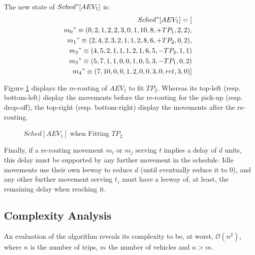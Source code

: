 The new state of $Sched"[AEV_1]$ is: 
\begin{align*}
Sched"[AEV_1] = [\\
m_0" \equiv ( 0, 2, 1, 2, 2, 3, 0, 1, 10, 8, +TP_1, 2, 2 ),\\
m_1" \equiv ( 2, 4, 2, 3, 2, 1, 1, 2, 8, 6, +TP_2, 0, 2 ),\\
m_2" \equiv ( 4, 5, 2, 1, 1, 1, 2, 1, 6, 5, -TP_2, 1, 1 )\\ 
m_3" \equiv ( 5, 7, 1, 1, 0, 0, 1, 0, 5, 3, -TP_1, 0, 2 )\\ 
m_4" \equiv ( 7, 10, 0, 0, 1, 2, 0, 0, 3, 0, ret, 3, 0 )]										 
\end{align*}	

Figure \ref{fig:sched_AEV_1_TP_2} displays the re-routing of $AEV_1$ to fit $TP_2$. 
Whereas its top-left (resp. bottom-left) display the movements before the re-routing for the pick-up (resp. drop-off), the top-right (resp. bottom-right) display the movements after the re-routing.
\begin{figure}[t]
  \vspace{-0.2cm}
  \centering
   {}
  \caption{$Sched[AEV_1]$ when Fitting $TP_2$}
  \label{fig:sched_AEV_1_TP_2}
  \vspace{-0.1cm}
\end{figure}

Finally, if a re-routing movement $m_i$ or $m_j$ serving $t$ implies a delay of $d$ units, this delay must be supported by any further movement in the schedule.  Idle movements use their own leeway to reduce $d$ (until eventually reduce it to 0),  and any other further movement serving $t_z$ must have a leeway of, at least, the remaining delay when reaching it.

\subsection{Complexity Analysis}
\label{complexity_analysis}

An evaluation of the algorithm reveals its complexity to be, at worst, $\mathcal{O}(n^2)$, where $n$ is the number of trips, $m$ the number of vehicles and $n > m$.


